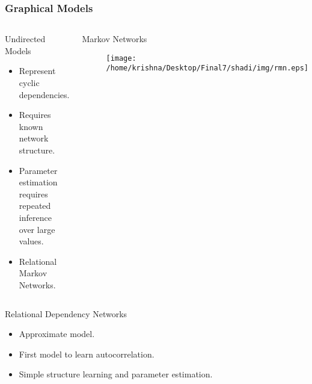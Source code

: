 \documentclass[10pt, blue,subsection=true, compress]{beamer}
\begin{document}
\begin{frame}\frametitle{Graphical Models}
\begin{columns}[t]
\begin{flushleft}
\begin{block}{Undirected Models}
\begin{itemize}
\item Represent cyclic dependencies. 
\item Requires known network structure.
 \item Parameter estimation requires repeated inference over large values.
 \item Relational Markov Networks.
\end{itemize}
\end{block}
\end{flushleft}
\begin{block}{Markov Networks}
\begin{figure}[htbp]
\centering
\texttt{[image: /home/krishna/Desktop/Final7/shadi/img/rmn.eps]}
\end{figure}
\end{block}
\end{columns}
\begin{center}
\begin{block}{{\color{red} Relational Dependency Networks}}
\begin{itemize}
\item Approximate model.
\item First model to learn autocorrelation. 
\item Simple structure learning and parameter estimation.
\end{itemize}
\end{block}
\end{center}
\end{frame}
\end{document}

